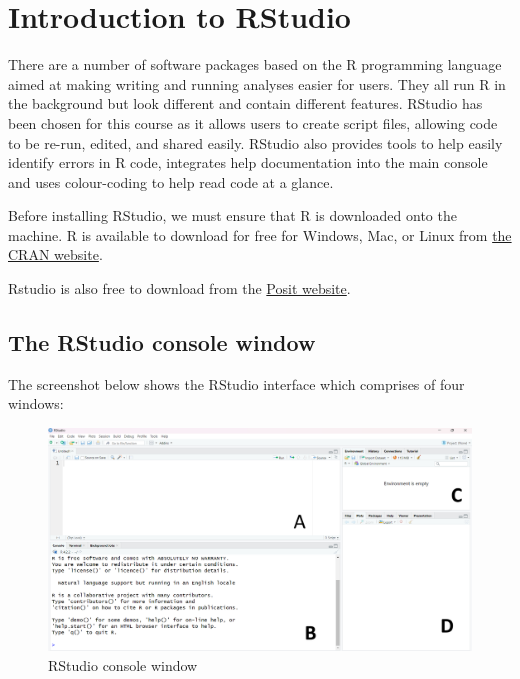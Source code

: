 \documentclass[
  letterpaper,
  DIV=11,
  numbers=noendperiod]{scrreprt}
\begin{document}

\chapter{Introduction to RStudio}\label{introduction-to-rstudio}

There are a number of software packages based on the R programming
language aimed at making writing and running analyses easier for users.
They all run R in the background but look different and contain
different features. RStudio has been chosen for this course as it allows
users to create script files, allowing code to be re-run, edited, and
shared easily. RStudio also provides tools to help easily identify
errors in R code, integrates help documentation into the main console
and uses colour-coding to help read code at a glance.

Before installing RStudio, we must ensure that R is downloaded onto the
machine. R is available to download for free for Windows, Mac, or Linux
from \href{https://cran.r-project.org/}{the CRAN website}.

Rstudio is also free to download from the \href{https://posit.co/}{Posit
website}.

\section{The RStudio console window}\label{the-rstudio-console-window}

The screenshot below shows the RStudio interface which comprises of four
windows:

\begin{figure}[H]

{\centering \includegraphics{img/rstudio_console.png}

}

\caption{RStudio console window}

\end{figure}%
\end{document}
